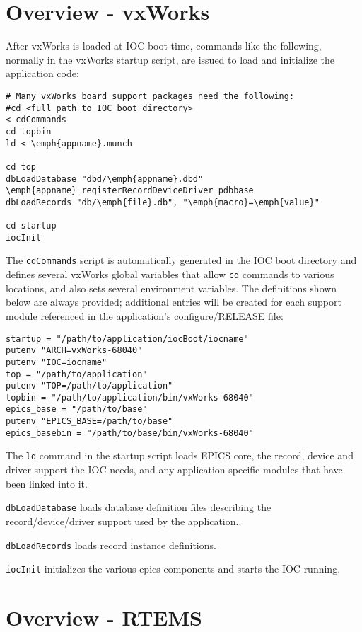 \section{Overview - vxWorks}

After vxWorks is loaded at IOC boot time, commands like the following, normally in the vxWorks startup script, are 
issued to load and initialize the application code:

\begin{verbatim}# Many vxWorks board support packages need the following:
#cd <full path to IOC boot directory>
< cdCommands
cd topbin
ld < \emph{appname}.munch

cd top
dbLoadDatabase "dbd/\emph{appname}.dbd"
\emph{appname}_registerRecordDeviceDriver pdbbase
dbLoadRecords "db/\emph{file}.db", "\emph{macro}=\emph{value}"

cd startup
iocInit
\end{verbatim}The \verb|cdCommands| script is automatically generated in the IOC boot directory and defines several vxWorks global 
variables that allow \verb|cd| commands to various locations, and also sets several environment variables. The definitions 
shown below are always provided; additional entries will be created for each support module referenced in the 
application's configure/RELEASE file:

\begin{verbatim}startup = "/path/to/application/iocBoot/iocname"
putenv "ARCH=vxWorks-68040"
putenv "IOC=iocname"
top = "/path/to/application"
putenv "TOP=/path/to/application"
topbin = "/path/to/application/bin/vxWorks-68040"
epics_base = "/path/to/base"
putenv "EPICS_BASE=/path/to/base"
epics_basebin = "/path/to/base/bin/vxWorks-68040"
\end{verbatim}The \verb|ld| command in the startup script loads EPICS core, the record, device and driver support the IOC needs, and any 
application specific modules that have been linked into it.

\verb|dbLoadDatabase| loads database definition files describing the record/device/driver support used by the application..

\verb|dbLoadRecords| loads record instance definitions.

\verb|iocInit| initializes the various epics components and starts the IOC running.

\section{Overview - RTEMS}


